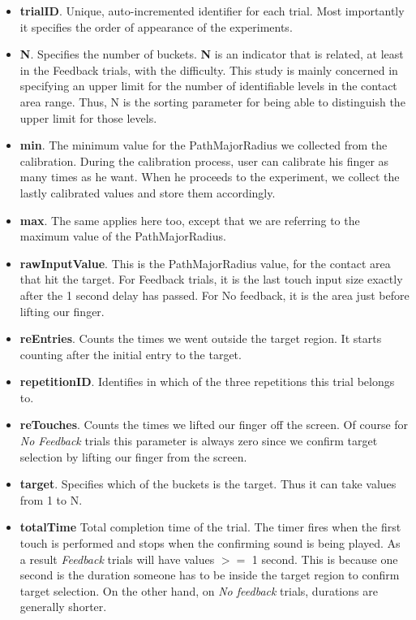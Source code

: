 \begin{itemize}
	\item \textbf{trialID}. Unique, auto-incremented identifier for each trial. Most importantly it specifies the order of appearance of the experiments. 

	\item \textbf{N}. Specifies the number of buckets. \textbf{N} is an indicator that is related, at least in the Feedback trials, with the difficulty. This study is mainly concerned in specifying an upper limit for the number of identifiable levels in the contact area range. Thus, N is the sorting parameter for being able to distinguish the upper limit for those levels. 
	
	\item \textbf{min}. The minimum value for the PathMajorRadius we collected from the calibration. During the calibration process, user can calibrate his finger as many times as he want. When he proceeds to the experiment, we collect the lastly calibrated values and store them accordingly.
	
	\item \textbf{max}. The same applies here too, except that we are referring to the maximum value of the PathMajorRadius.  
	
	\item \textbf{rawInputValue}. This is the PathMajorRadius value, for the contact area that hit the target. For Feedback trials, it is the last touch input size exactly after the 1 second delay has passed. For No feedback, it is the area just before lifting our finger.
	
	\item \textbf{reEntries}. Counts the times we went outside the target region. It starts counting after the initial entry to the target.
	
	\item \textbf{repetitionID}. Identifies in which of the three repetitions this trial belongs to.  
	
	\item \textbf{reTouches}. Counts the times we lifted our finger off the screen. Of course for \emph{No Feedback} trials this parameter is always zero since we confirm target selection by lifting our finger from the screen.
	
	\item \textbf{target}. Specifies which of the buckets is the target. Thus it can take values from 1 to N.
	
	\item \textbf{totalTime} Total completion time of the trial. The timer fires when the first touch is performed and stops when the confirming sound is being played. As a result \emph{Feedback} trials will have values $>=$ 1 second. This is because one second is the duration  someone has to be inside the target region to confirm target selection. On the other hand, on \emph{No feedback} trials, durations are generally shorter.
\end{itemize}



